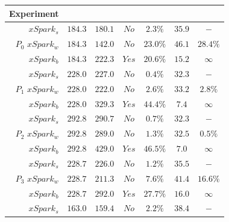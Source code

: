 \begin{table}[htbp]
	\centering
	\begin{tabular}{r|c|c|c|c|c|c}
		\multicolumn{1}{c|}{\textbf{Experiment}}   &
		\rotatebox{90}{\boldmath$deadline\,[s]$}  &  \rotatebox{90}{\boldmath$exec\_time\,[s]$}  & \rotatebox{90}{\boldmath$violation$} &  \rotatebox{90}{\boldmath$error$}    & \rotatebox{90}{\boldmath$core\_alloc\,[\frac{core}{s}]$}  & \rotatebox{90}{\boldmath$penalty$}   \\
		\midrule
		$xSpark_s$  & $184.3$   & $180.1$   & $No$   & $2.3\%$   & $35.9$   & $-$  \\
		$P_0 \,\,xSpark_w$  & $184.3$   & $142.0$   & $No$   & $23.0\%$   & $46.1$   & $28.4\%$  \\
		$xSpark_b$  & $184.3$   & $222.3$   & $Yes$   & $20.6\%$   & $15.2$   & $\infty$  \\
		\midrule
		$xSpark_s$  & $228.0$   & $227.0$   & $No$   & $0.4\%$   & $32.3$   & $-$  \\
		$P_1 \,\,xSpark_w$  & $228.0$   & $222.0$   & $No$   & $2.6\%$   & $33.2$   & $2.8\%$  \\
		$xSpark_b$  & $228.0$   & $329.3$   & $Yes$   & $44.4\%$   & $7.4$   & $\infty$  \\
		\midrule
		$xSpark_s$  & $292.8$   & $290.7$   & $No$   & $0.7\%$   & $32.3$   & $-$  \\
		$P_2 \,\,xSpark_w$  & $292.8$   & $289.0$   & $No$   & $1.3\%$   & $32.5$   & $0.5\%$  \\
		$xSpark_b$  & $292.8$   & $429.0$   & $Yes$   & $46.5\%$   & $7.0$   & $\infty$  \\
		\midrule
		$xSpark_s$  & $228.7$   & $226.0$   & $No$   & $1.2\%$   & $35.5$   & $-$  \\
		$P_3 \,\,xSpark_w$  & $228.7$   & $211.3$   & $No$   & $7.6\%$   & $41.4$   & $16.6\%$  \\
		$xSpark_b$  & $228.7$   & $292.0$   & $Yes$   & $27.7\%$   & $16.0$   & $\infty$  \\
		\midrule
		$xSpark_s$  & $163.0$   & $159.4$   & $No$   & $2.2\%$   & $38.4$   & $-$  \\

\end{tabular}
\end{table}
